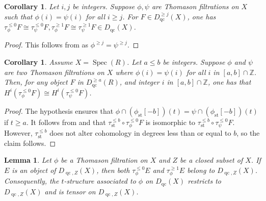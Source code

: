 \documentclass[11pt]{amsart}
\theoremstyle{plain}
\newtheorem{lemma}[theorem]{Lemma}
\newtheorem{corollary}[theorem]{Corollary}
\theoremstyle{definition}
\numberwithin{equation}{section}
\numberwithin{theorem}{section}
\begin{document}
\begin{corollary}\label{cor:filtrations_agreeing_after_some_point_have_same_truncation}
    Let $i,j$ be integers. Suppose $\phi,\psi$ are Thomason filtrations on $X$ such that $\phi (i) = \psi(i)$ for all $i\geq j$. For $F\in D^{\geq j}_{\operatorname{qc}}(X)$, one has $\tau^{\leq 0}_\phi F\cong \tau^{\leq 0}_\psi F,\tau^{\geq 1}_\phi F\cong \tau^{\geq 1}_\psi F \in D_{\operatorname{qc}}(X)$.
\end{corollary}

\begin{proof}
    This follows from  as $\phi^{\geq j} = \psi^{\geq j}$.
\end{proof}

\begin{corollary}\label{cor:cohomology_for_filtrations_agreeing_on_strip}
    Assume $X=\operatorname{Spec}(R)$. Let $a\leq b$ be integers. Suppose $\phi$ and $\psi$ are two Thomason filtrations on $X$ where $\phi (i) = \psi(i)$ for all $i$ in $[a,b]\cap \mathbb{Z}$. Then, for any object $F$ in $D^{\geq a}_{\operatorname{qc}}(R)$, and integer $i$ in $[a,b]\cap \mathbb{Z}$, one has that $H^i(\tau^{\leq 0}_\phi F)\cong H^i(\tau^{\leq 0}_\psi F)$.
\end{corollary}

\begin{proof}
    The hypothesis ensures that $\phi \cap ( \phi _{\operatorname{st}}[-b])(t)= \psi \cap( \phi _{\operatorname{st}}[-b])(t)$ if $t\geq a$. It follows from \cite[Lemma 5.2]{Smith:2022} and  that $\tau^{\leq b}_{\operatorname{st}}\circ \tau^{\leq 0}_\phi F$ is isomorphic to $\tau^{\leq b}_{\operatorname{st}}\circ \tau^{\leq 0}_{\psi} F$. However, $\tau^{\leq b}_{\operatorname{st}}$ does not alter cohomology in degrees less than or equal to $b$, so the claim follows.
\end{proof}

\begin{lemma}\label{lem:all_associated_t_structures_restrict}
    Let $\phi$ be a Thomason filtration on $X$ and $Z$ be a closed subset of $X$. If $E$ is an object of $D_{\operatorname{qc},Z}(X)$, then both $\tau^{\leq 0}_\phi E$ and $\tau^{\geq 1}_\phi E$ belong to $D_{\operatorname{qc},Z}(X)$. Consequently, the $t$-structure associated to $\phi$ on $D_{\operatorname{qc}}(X)$ restricts to $D_{\operatorname{qc},Z}(X)$ and is tensor on $D_{\operatorname{qc},Z}(X)$.
\end{lemma}
\end{document}
